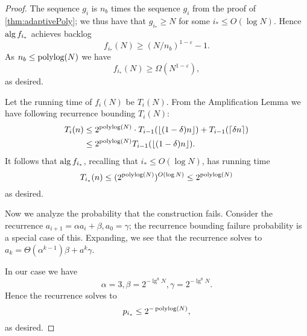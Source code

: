 \begin{proof}
  The sequence $g_i$ is $n_b$ times the sequence $g_i$ from
  the proof of \cref{thm:adaptivePoly}; we thus have that $g_{i_*}
  \ge N$ for some $i_* \le O(\log N)$.
  Hence $\operatorname{\text{\textup{alg}}}{f_{i_*}}$ achieves backlog 
  $$f_{i_*}(N) \ge (N/n_b)^{1-\varepsilon}-1.$$
  As $n_b \le \operatorname{\text{polylog}}(N)$ we have
  $$f_{i_*}(N) \ge \Omega(N^{1-\varepsilon}),$$ as desired.

  Let the running time of $f_i(N)$ be $T_i(N)$. From the Amplification Lemma we have following recurrence bounding $T_i(N)$:
  \begin{align*}
    T_i(n) &\le 2^{\operatorname{\text{polylog}}(N)} \cdot T_{i-1}(\left\lfloor (1-\delta)n \right\rfloor) + T_{i-1}(\left\lceil \delta n \right\rceil) \\
            &\le 2^{\operatorname{\text{polylog}}(N)}T_{i-1}(\left\lfloor (1-\delta)n \right\rfloor).
  \end{align*}
  It follows that $\operatorname{\text{\textup{alg}}}{f_{i_*}}$, recalling that $i_* \le O(\log N)$, has running time
  $$T_{i_*}(n) \le (2^{\operatorname{\text{polylog}}(N)})^{O(\log N)} \le 2^{\operatorname{\text{polylog}}(N)}$$
  as desired.

  Now we analyze the probability that the construction fails. 
  Consider the recurrence $a_{i+1} = \alpha a_i + \beta, a_0 =
  \gamma$; the recurrence bounding failure probability is a
  special case of this. Expanding, we see that the recurrence
  solves to $a_k = \Theta(\alpha^{k-1})\beta + a^k \gamma$.

  In our case we have 
  $$\alpha = 3, \beta = 2^{-\lg^8 N}, \gamma = 2^{-\lg^8 N}.$$
  Hence the recurrence solves to 
  $$p_{i_*} \le 2^{-\operatorname{\text{polylog}}(N)},$$
  as desired.

\end{proof}


